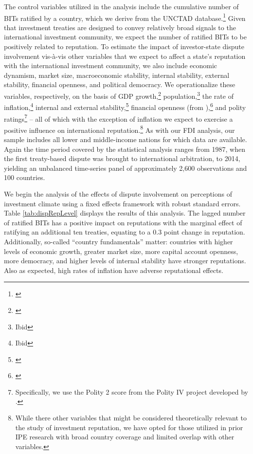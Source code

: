 \documentclass[12pt,onesided]{amsart}
\begin{document}
The control variables utilized in the analysis include the cumulative number of BITs ratified by a country, which we derive from the UNCTAD database.\footnote{\citet{unctad:2013c}} Given that investment treaties are designed to convey relatively broad signals to the international investment community, we expect the number of ratified BITs to be positively related to reputation. To estimate the impact of investor-state dispute involvement vis-\`{a}-vis other variables that we expect to affect a state's reputation with the international investment community, we also include economic dynamism, market size, macroeconomic stability, internal stability, external stability, financial openness, and political democracy. We operationalize these variables, respectively, on the basis of GDP growth,\footnote{\citet{worldbank:2013}} population,\footnote{Ibid} the rate of inflation,\footnote{Ibid} internal and external stability,\footnote{\citet{prs:2013}} financial openness (from \citeauthor{chinn:ito:2008}),\footnote{\citet{chinn:ito:2008}} and polity ratings\footnote{Specifically, we use the Polity 2 score from the Polity IV project developed by \citet{marshall2013polity}.} -- all of which with the exception of inflation we expect to exercise a positive influence on international reputation.\footnote{While there other variables that might be considered theoretically relevant to the study of investment reputation, we have opted for those utilized in prior IPE research with broad country coverage and limited overlap with other variables.} As with our FDI analysis, our sample includes all lower and middle-income nations for which data are available. Again the time period covered by the statistical analysis ranges from 1987, when the first treaty-based dispute was brought to international arbitration, to 2014, yielding an unbalanced time-series panel of approximately 2,600 observations and 100 countries.

We begin the analysis of the effects of dispute involvement on perceptions of investment climate using a fixed effects framework with robust standard errors. Table \ref{tab:dispRepLevel} displays the results of this analysis. The lagged number of ratified BITs has a positive impact on reputations with the marginal effect of ratifying an additional ten treaties, equating to a 0.3 point change in reputation. Additionally, so-called ``country fundamentals'' matter: countries with higher levels of economic growth, greater market size, more capital account openness, more democracy, and higher levels of internal stability have stronger reputations. Also as expected, high rates of inflation have adverse reputational effects.
\end{document}
